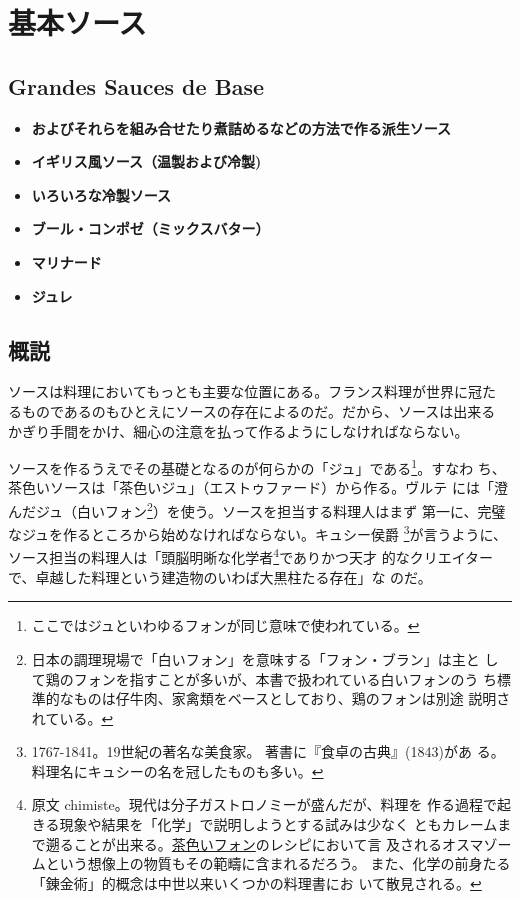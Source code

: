 \newpage

\hypertarget{grandessaucesdebase}{%
\section{基本ソース}\label{grandessaucesdebase}}

\hypertarget{grandes-sauces-de-base}{%
\subsection{Grandes Sauces de Base}\label{grandes-sauces-de-base}}


\begin{itemize}
\item
  \textbf{およびそれらを組み合せたり煮詰めるなどの方法で作る派生ソース}
\item
  \textbf{イギリス風ソース（温製および冷製)}
\item
  \textbf{いろいろな冷製ソース}
\item
  \textbf{ブール・コンポゼ（ミックスバター）}
\item
  \textbf{マリナード}
\item
  \textbf{ジュレ}
\end{itemize}

\hypertarget{osbservationsurlasauce}{%
\subsection{概説}\label{osbservationsurlasauce}}

ソースは料理においてもっとも主要な位置にある。フランス料理が世界に冠た
るものであるのもひとえにソースの存在によるのだ。だから、ソースは出来る
かぎり手間をかけ、細心の注意を払って作るようにしなければならない。

ソースを作るうえでその基礎となるのが何らかの「ジュ」である\footnote{ここではジュといわゆるフォンが同じ意味で使われている。}。すなわ
ち、茶色いソースは「茶色いジュ」（エストゥファード）から作る。ヴルテ
には「澄んだジュ（白いフォン\footnote{日本の調理現場で「白いフォン」を意味する「フォン・ブラン」は主と
  して鶏のフォンを指すことが多いが、本書で扱われている白いフォンのう
  ち標準的なものは仔牛肉、家禽類をベースとしており、鶏のフォンは別途
  説明されている。}）を使う。ソースを担当する料理人はまず
第一に、完璧なジュを作るところから始めなければならない。キュシー侯爵
\footnote{1767-1841。19世紀の著名な美食家。
  著書に『食卓の古典』(1843)があ
  る。料理名にキュシーの名を冠したものも多い。}が言うように、ソース担当の料理人は「頭脳明晰な化学者\footnote{原文
  chimiste。現代は分子ガストロノミーが盛んだが、料理を
  作る過程で起きる現象や結果を「化学」で説明しようとする試みは少なく
  ともカレームまで遡ることが出来る。\protect\hyperlink{fonds-brun}{茶色いフォン}のレシピにおいて言
  及されるオスマゾームという想像上の物質もその範疇に含まれるだろう。
  また、化学の前身たる「錬金術」的概念は中世以来いくつかの料理書にお
  いて散見される。}でありかつ天才
的なクリエイターで、卓越した料理という建造物のいわば大黒柱たる存在」な
のだ。

